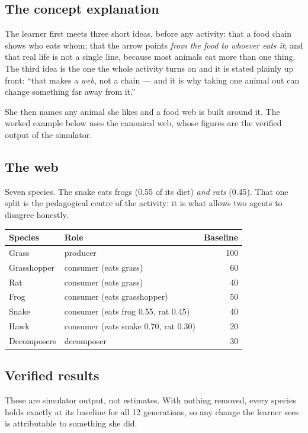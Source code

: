 \documentclass[11pt,a4paper]{article}
\begin{document}
\subsection*{The concept explanation}

The learner first meets three short ideas, before any activity: that a food chain shows who eats
whom; that the arrow points \emph{from the food to whoever eats it}; and that real life is not a
single line, because most animals eat more than one thing. The third idea is the one the whole
activity turns on and it is stated plainly up front: ``that makes a \emph{web}, not a chain ---
and it is why taking one animal out can change something far away from it.''

She then names any animal she likes and a food web is built around it. The worked example below
uses the canonical web, whose figures are the verified output of the simulator.

\subsection*{The web}

Seven species. The snake eats frogs (0.55 of its diet) \emph{and rats} (0.45). That one split is
the pedagogical centre of the activity: it is what allows two agents to disagree honestly.

\begin{center}
\begin{tabular}{@{}llr@{}}
\toprule
\textbf{Species} & \textbf{Role} & \textbf{Baseline}\\
\midrule
Grass & producer & 100\\
Grasshopper & consumer (eats grass) & 60\\
Rat & consumer (eats grass) & 40\\
Frog & consumer (eats grasshopper) & 50\\
Snake & consumer (eats frog 0.55, rat 0.45) & 40\\
Hawk & consumer (eats snake 0.70, rat 0.30) & 20\\
Decomposers & decomposer & 30\\
\bottomrule
\end{tabular}
\end{center}

\subsection*{Verified results}

These are simulator output, not estimates. With nothing removed, every species holds exactly at
its baseline for all 12 generations, so any change the learner sees is attributable to something
she did.
\end{document}
